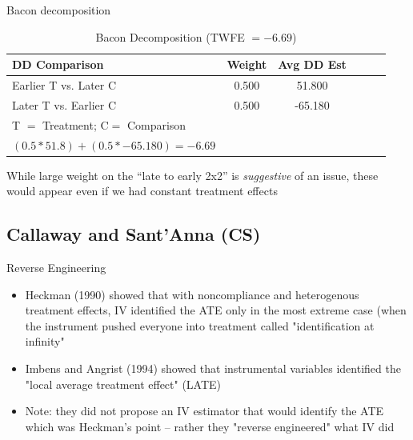 \documentclass{beamer}
\begin{document}
\begin{frame}{Bacon decomposition}
\begin{table}[htbp]\centering
\small
\caption{Bacon Decomposition (TWFE $= -6.69$)}
\begin{center}
\begin{tabular}{l*{5}{c}}
\hline
\multicolumn{1}{l}{\textbf{DD Comparison}}&
\multicolumn{1}{l}{\textbf{Weight}}&
\multicolumn{1}{l}{\textbf{Avg DD Est}}\\
\hline
Earlier T vs. Later C  &     0.500   &       51.800 \\
Later T vs. Earlier C   &    0.500    &     -65.180 \\
\midrule
T $=$ Treatment; C$ =$ Comparison \\
$(0.5*51.8) + (0.5*-65.180) = -6.69$ \\
\hline
\end{tabular}
\end{center}
\end{table}

\bigskip

While large weight on the ``late to early 2x2'' is \emph{suggestive} of an issue, these would appear even if we had constant treatment effects

\end{frame}


\subsection{Callaway and Sant'Anna (CS)}


\begin{frame}{Reverse Engineering}

\begin{itemize}
\item Heckman (1990) showed that with noncompliance and heterogenous treatment effects, IV identified the ATE only in the most extreme case (when the instrument pushed everyone into treatment called "identification at infinity"
\item Imbens and Angrist (1994) showed that instrumental variables identified the "local average treatment effect" (LATE)
\item Note: they did not propose an IV estimator that would identify the ATE which was Heckman's point -- rather they "reverse engineered" what IV did
\end{itemize}

\end{frame}
\end{document}

